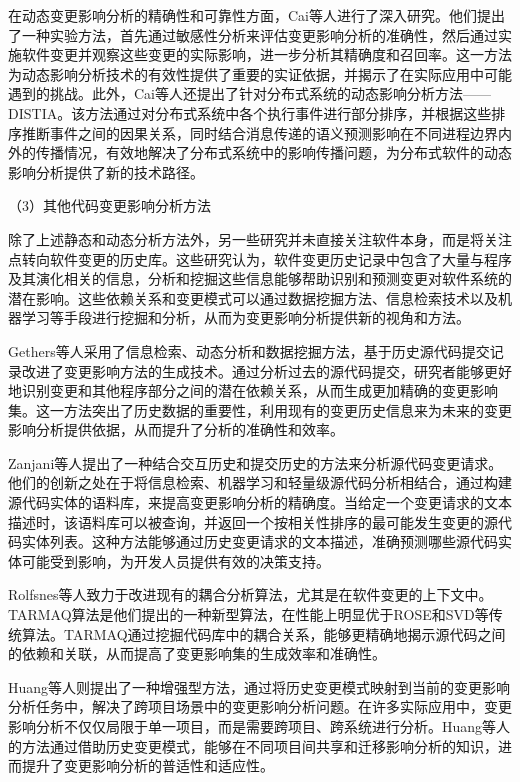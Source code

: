 在动态变更影响分析的精确性和可靠性方面，Cai等人\cite{2015Acom,2014Estimating}进行了深入研究。他们提出了一种实验方法，首先通过敏感性分析来评估变更影响分析的准确性，然后通过实施软件变更并观察这些变更的实际影响，进一步分析其精确度和召回率。这一方法为动态影响分析技术的有效性提供了重要的实证依据，并揭示了在实际应用中可能遇到的挑战。此外，Cai等人还提出了针对分布式系统的动态影响分析方法——DISTIA\cite{2016DistIA}。该方法通过对分布式系统中各个执行事件进行部分排序，并根据这些排序推断事件之间的因果关系，同时结合消息传递的语义预测影响在不同进程边界内外的传播情况，有效地解决了分布式系统中的影响传播问题，为分布式软件的动态影响分析提供了新的技术路径。

（3）其他代码变更影响分析方法

除了上述静态和动态分析方法外，另一些研究并未直接关注软件本身，而是将关注点转向软件变更的历史库\cite{2011An, Markus2017Supporting, 2008Mining, 2014Impact, 2016Generalizing}。这些研究认为，软件变更历史记录中包含了大量与程序及其演化相关的信息，分析和挖掘这些信息能够帮助识别和预测变更对软件系统的潜在影响。这些依赖关系和变更模式可以通过数据挖掘方法、信息检索技术以及机器学习等手段进行挖掘和分析，从而为变更影响分析提供新的视角和方法。

Gethers等人\cite{2011An}采用了信息检索、动态分析和数据挖掘方法，基于历史源代码提交记录改进了变更影响方法的生成技术。通过分析过去的源代码提交，研究者能够更好地识别变更和其他程序部分之间的潜在依赖关系，从而生成更加精确的变更影响集。这一方法突出了历史数据的重要性，利用现有的变更历史信息来为未来的变更影响分析提供依据，从而提升了分析的准确性和效率。

Zanjani等人\cite{2014Impact}提出了一种结合交互历史和提交历史的方法来分析源代码变更请求。他们的创新之处在于将信息检索、机器学习和轻量级源代码分析相结合，通过构建源代码实体的语料库，来提高变更影响分析的精确度。当给定一个变更请求的文本描述时，该语料库可以被查询，并返回一个按相关性排序的最可能发生变更的源代码实体列表。这种方法能够通过历史变更请求的文本描述，准确预测哪些源代码实体可能受到影响，为开发人员提供有效的决策支持。

Rolfsnes等人\cite{2016Generalizing}致力于改进现有的耦合分析算法，尤其是在软件变更的上下文中。TARMAQ算法是他们提出的一种新型算法，在性能上明显优于ROSE\cite{2005Mining}和SVD等传统算法。TARMAQ通过挖掘代码库中的耦合关系，能够更精确地揭示源代码之间的依赖和关联，从而提高了变更影响集的生成效率和准确性。

Huang等人\cite{2021Change}则提出了一种增强型方法，通过将历史变更模式映射到当前的变更影响分析任务中，解决了跨项目场景中的变更影响分析问题。在许多实际应用中，变更影响分析不仅仅局限于单一项目，而是需要跨项目、跨系统进行分析。Huang等人的方法通过借助历史变更模式，能够在不同项目间共享和迁移影响分析的知识，进而提升了变更影响分析的普适性和适应性。






